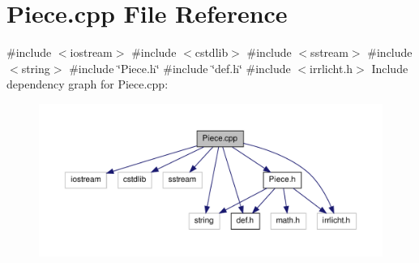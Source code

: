 \section{\-Piece.\-cpp \-File \-Reference}
\label{_piece_8cpp}
{\ttfamily \#include $<$iostream$>$}\*
{\ttfamily \#include $<$cstdlib$>$}\*
{\ttfamily \#include $<$sstream$>$}\*
{\ttfamily \#include $<$string$>$}\*
{\ttfamily \#include \char`\"{}\-Piece.\-h\char`\"{}}\*
{\ttfamily \#include \char`\"{}def.\-h\char`\"{}}\*
{\ttfamily \#include $<$irrlicht.\-h$>$}\*
\-Include dependency graph for \-Piece.\-cpp\-:
\nopagebreak
\begin{figure}[H]
\begin{center}
\leavevmode
\includegraphics[width=350pt]{_piece_8cpp__incl}
\end{center}
\end{figure}

